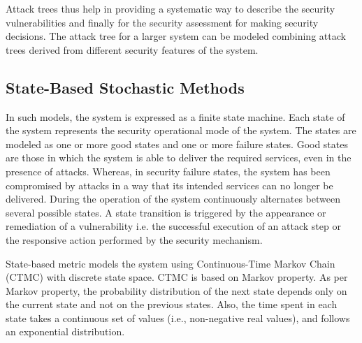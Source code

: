 \documentclass[pdftex,english,oribibl]{llncs}
\begin{document}
Attack trees thus help in providing a systematic way to describe the security vulnerabilities and finally for the security assessment for making security decisions. The attack tree for a larger system can be modeled combining attack trees derived from different security features of the system.  

\subsection{State-Based Stochastic Methods}
In such models, the system is expressed as a finite state machine.  Each state of the system represents the security operational mode of the system. The states are modeled as one or more good states and one or more failure states. Good states are those in which the system is able to deliver the required services, even in the presence of attacks. Whereas, in security failure states, the system has been compromised by attacks in a way that its intended services can no longer be delivered. During the operation of the system continuously alternates between several possible states. A state transition is triggered by the appearance or remediation of a vulnerability i.e. the successful execution of an attack step or the responsive action performed by the security mechanism.

State-based metric models the system using Continuous-Time Markov Chain (CTMC) with discrete state space. CTMC is based on Markov property. As per Markov property, the probability distribution of the next state depends only on the current state and not on the previous states. Also, the time spent in each state takes a continuous set of values (i.e., non-negative real values), and follows an exponential distribution.
\end{document}
